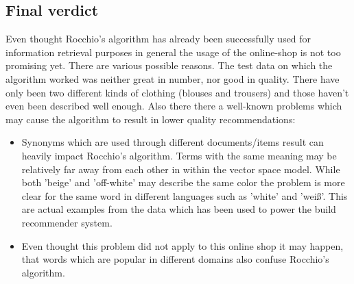 \subsection{Final verdict}
Even thought Rocchio's algorithm has already been successfully used for information retrieval purposes in general \citep[p.~183]{manning:2009} the usage of the online-shop is not too promising yet.
There are various possible reasons.
The test data on which the algorithm worked was neither great in number, nor good in quality.
There have only been two different kinds of clothing (blouses and trousers) and those haven't even been described well enough.
Also there there a well-known problems which may cause the algorithm to result in lower quality recommendations:
\begin{itemize}

    \item Synonyms which are used through different documents/items result can heavily impact Rocchio's algorithm.
        Terms with the same meaning may be relatively far away from each other in within the vector space model.
        \citep[p.~184]{manning:2009}
        While both 'beige' and 'off-white' may describe the same color the problem is more clear for the same word in different languages such as 'white' and 'wei\ss{}'.
        This are actual examples from the data which has been used to power the build recommender system.

    \item Even thought this problem did not apply to this online shop it may happen, that words which are popular in different domains also confuse Rocchio's algorithm.
    \citep[p.~184]{manning:2009}
\end{itemize}

